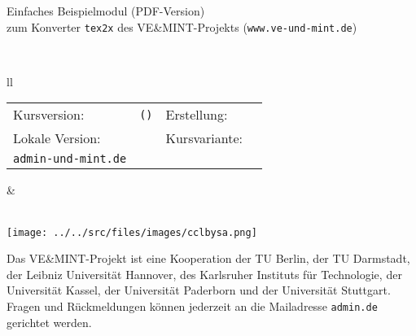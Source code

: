 \begin{framed}
\begin{center}
\LARGE
Einfaches Beispielmodul (PDF-Version)\\
\large
zum Konverter \texttt{tex2x} des VE\&MINT-Projekts (\texttt{www.ve-und-mint.de})
\end{center}
\ \\
\begin{tabular}{ll}
\begin{minipage}{12.5cm}
\begin{tabular}{llll}
Kursversion: & \texttt{\MSignatureMain (\MSignatureVersion)} &
Erstellung: & \MSignatureDate\\
Lokale Version: & \texttt{\MSignatureLocalization} &
Kursvariante: & \texttt{\MSignatureVariant}\\
\scriptsize \texttt{admin\@@ve-und-mint.de}
\end{tabular}
\end{minipage}
&
\begin{minipage}{3cm}
\ \\
\texttt{[image: ../../src/files/images/cclbysa.png]}
\end{minipage}
\end{tabular}
\end{framed}

Das VE\&MINT-Projekt ist eine Kooperation der TU Berlin, der TU Darmstadt, der Leibniz Universität Hannover, des Karlsruher
Instituts für Technologie, der Universität Kassel, der Universität Paderborn und der Universität Stuttgart.
Fragen und Rückmeldungen können jederzeit an die Mailadresse \texttt{admin\@@veundmint.de} gerichtet werden.

\Mtableofcontents

